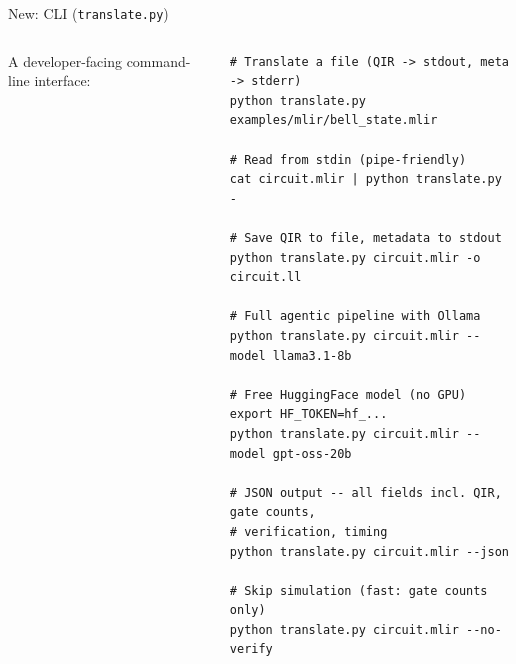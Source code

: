 \documentclass[aspectratio=169,10pt]{beamer}
\begin{document}
\begin{frame}[fragile]{New: CLI (\texttt{translate.py})}
  \begin{columns}[T]
      A developer-facing command-line interface:
      \begin{lstlisting}[style=pystyle]
# Translate a file (QIR -> stdout, meta -> stderr)
python translate.py examples/mlir/bell_state.mlir

# Read from stdin (pipe-friendly)
cat circuit.mlir | python translate.py -

# Save QIR to file, metadata to stdout
python translate.py circuit.mlir -o circuit.ll

# Full agentic pipeline with Ollama
python translate.py circuit.mlir --model llama3.1-8b

# Free HuggingFace model (no GPU)
export HF_TOKEN=hf_...
python translate.py circuit.mlir --model gpt-oss-20b

# JSON output -- all fields incl. QIR, gate counts,
# verification, timing
python translate.py circuit.mlir --json

# Skip simulation (fast: gate counts only)
python translate.py circuit.mlir --no-verify


\end{lstlisting}
\end{columns}
\end{frame}
\end{document}
